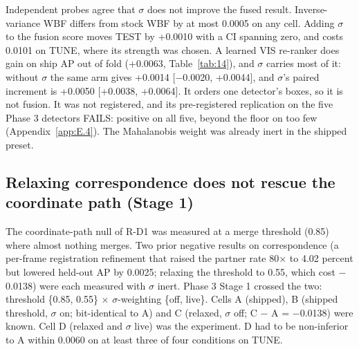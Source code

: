 \documentclass[journal,onecolumn]{IEEEtran}
\begin{document}
Independent probes agree that $\sigma$ does not improve the fused result. Inverse-variance WBF differs from stock WBF by at most 0.0005 on any cell. Adding $\sigma$ to the fusion score moves TEST by +0.0010 with a CI spanning zero, and costs 0.0101 on TUNE, where its strength was chosen. A learned VIS re-ranker does gain on ship AP out of fold (+0.0063, Table~\ref{tab:14}), and $\sigma$ carries most of it: without $\sigma$ the same arm gives +0.0014 [$-$0.0020, +0.0044], and $\sigma$'s paired increment is +0.0050 [+0.0038, +0.0064]. It orders one detector's boxes, so it is not fusion. It was not registered, and its pre-registered replication on the five Phase 3 detectors FAILS: positive on all five, beyond the floor on too few (Appendix~\ref{app:E.4}). The Mahalanobis weight was already inert in the shipped preset.

\subsection{Relaxing correspondence does not rescue the coordinate path (Stage 1)}\label{app:E.3}
The coordinate-path null of R-D1 was measured at a merge threshold (0.85) where almost nothing merges. Two prior negative results on correspondence (a per-frame registration refinement that raised the partner rate 80$\times$ to 4.02 percent but lowered held-out AP by 0.0025; relaxing the threshold to 0.55, which cost $-$0.0138) were each measured with $\sigma$ inert. Phase 3 Stage 1 crossed the two: threshold \{0.85, 0.55\} $\times$ $\sigma$-weighting \{off, live\}. Cells A (shipped), B (shipped threshold, $\sigma$ on; bit-identical to A) and C (relaxed, $\sigma$ off; C $-$ A = $-$0.0138) were known. Cell D (relaxed and $\sigma$ live) was the experiment. D had to be non-inferior to A within 0.0060 on at least three of four conditions on TUNE.
\end{document}

